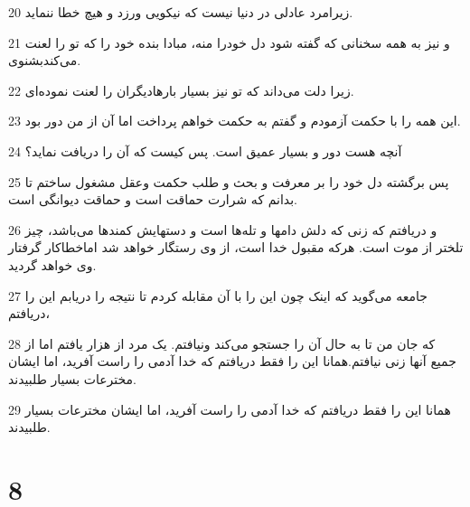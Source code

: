 \par 20 زیرامرد عادلی در دنیا نیست که نیکویی ورزد و هیچ خطا ننماید.
\par 21 و نیز به همه سخنانی که گفته شود دل خودرا منه، مبادا بنده خود را که تو را لعنت می‌کندبشنوی.
\par 22 زیرا دلت می‌داند که تو نیز بسیار بارهادیگران را لعنت نموده‌ای.
\par 23 این همه را با حکمت آزمودم و گفتم به حکمت خواهم پرداخت اما آن از من دور بود.
\par 24 آنچه هست دور و بسیار عمیق است. پس کیست که آن را دریافت نماید؟
\par 25 پس برگشته دل خود را بر معرفت و بحث و طلب حکمت وعقل مشغول ساختم تا بدانم که شرارت حماقت است و حماقت دیوانگی است.
\par 26 و دریافتم که زنی که دلش دامها و تله‌ها است و دستهایش کمندها می‌باشد، چیز تلختر از موت است. هر‌که مقبول خدا است، از وی رستگار خواهد شد اماخطاکار گرفتار وی خواهد گردید.
\par 27 جامعه می‌گوید که اینک چون این را با آن مقابله کردم تا نتیجه را دریابم این را دریافتم،
\par 28 که جان من تا به حال آن را جستجو می‌کند ونیافتم. یک مرد از هزار یافتم اما از جمیع آنها زنی نیافتم.همانا این را فقط دریافتم که خدا آدمی را راست آفرید، اما ایشان مخترعات بسیار طلبیدند.
\par 29 همانا این را فقط دریافتم که خدا آدمی را راست آفرید، اما ایشان مخترعات بسیار طلبیدند.
 
\chapter{8}

